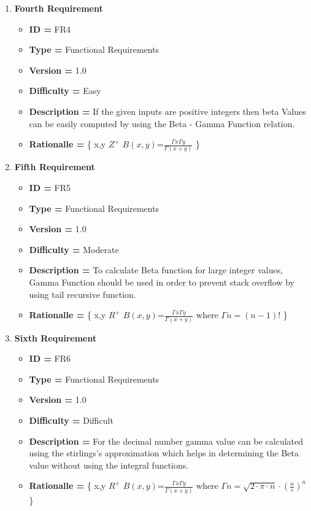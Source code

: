\documentclass[a4paper, 12pt]{article}
\begin{document}
\begin{enumerate}[noitemsep]
        \newpage
        \item \textbf{Fourth Requirement}
        \begin{itemize}
            \item \textbf{ID = } FR4
            \item\textbf{Type = } Functional Requirements
            \item\textbf{Version = } 1.0
            \item\textbf{Difficulty = } Easy
            \item\textbf{Description = } If the given inputs are positive integers then beta Values can be easily computed by using the Beta - Gamma Function relation.
            \item\textbf{Rationalle = } \{ \forall x,y \in $Z^{+}$ \mid $B(x,y)$=$\frac{{\Gamma x} {\Gamma y}}{\Gamma (x+y)}$ \}
        \end{itemize}
        \item \textbf{Fifth Requirement}
        \begin{itemize}
            \item \textbf{ID = } FR5
            \item\textbf{Type = } Functional Requirements
            \item\textbf{Version = } 1.0
            \item\textbf{Difficulty = } Moderate
            \item\textbf{Description = } To calculate Beta function for large integer values, Gamma Function should be used in order to prevent stack overflow by using tail recursive function.
            \item\textbf{Rationalle = } \{ \forall x,y \in $R^+$ \mid $B(x,y)$=$\frac{{\Gamma x} {\Gamma y}}{\Gamma (x+y)}$ where $\Gamma n = (n-1)! $ \}
        \end{itemize}
        
        \item \textbf{Sixth Requirement}
        \begin{itemize}
            \item \textbf{ID = } FR6
            \item\textbf{Type = } Functional Requirements
            \item\textbf{Version = } 1.0
            \item\textbf{Difficulty = } Difficult
            \item\textbf{Description = } For the decimal number gamma value can be calculated using the stirlings's approximation which helps in determining the Beta value without using the integral functions.
            \item\textbf{Rationalle = } \{ \forall x,y \in $R^{+}$ \mid $B(x,y)$=$\frac{{\Gamma x} {\Gamma y}}{\Gamma (x+y)}$ where $\Gamma n = \sqrt{2 \cdot \pi \cdot n}\cdot (\frac{n}{e})^{n}$ \} 
        \end{itemize}
        

\end{enumerate}
\end{document}

